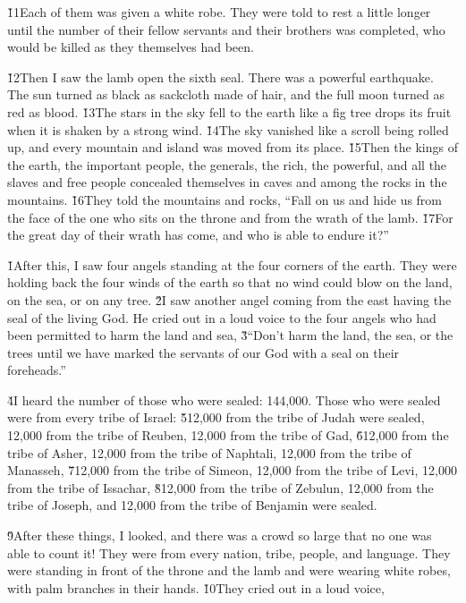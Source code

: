 \v{11}Each of them was given a white robe. They were told to rest a little longer until the number of their fellow servants and their brothers was completed, who would be killed as they themselves had been.

\v{12}Then I saw the lamb open the sixth seal. There was a powerful earthquake. The sun turned as black as sackcloth made of hair, and the full moon turned as red as blood. \v{13}The stars in the sky fell to the earth like a fig tree drops its fruit when it is shaken by a strong wind. \v{14}The sky vanished like a scroll being rolled up, and every mountain and island was moved from its place. \v{15}Then the kings of the earth, the important people, the generals, the rich, the powerful, and all the slaves and free people concealed themselves in caves and among the rocks in the mountains. \v{16}They told the mountains and rocks, ``Fall on us and hide us from the face of the one who sits on the throne and from the wrath of the lamb. \v{17}For the great day of their wrath has come, and who is able to endure it?''

\v{1}After this, I saw four angels standing at the four corners of the earth. They were holding back the four winds of the earth so that no wind could blow on the land, on the sea, or on any tree. \v{2}I saw another angel coming from the east having the seal of the living God. He cried out in a loud voice to the four angels who had been permitted to harm the land and sea, \v{3}``Don't harm the land, the sea, or the trees until we have marked the servants of our God with a seal on their foreheads.''

\v{4}I heard the number of those who were sealed: 144,000. Those who were sealed were from every tribe of Israel: \v{5}12,000 from the tribe of Judah were sealed, 12,000 from the tribe of Reuben, 12,000 from the tribe of Gad, \v{6}12,000 from the tribe of Asher, 12,000 from the tribe of Naphtali, 12,000 from the tribe of Manasseh, \v{7}12,000 from the tribe of Simeon, 12,000 from the tribe of Levi, 12,000 from the tribe of Issachar, \v{8}12,000 from the tribe of Zebulun, 12,000 from the tribe of Joseph, and 12,000 from the tribe of Benjamin were sealed.

\v{9}After these things, I looked, and there was a crowd so large that no one was able to count it! They were from every nation, tribe, people, and language. They were standing in front of the throne and the lamb and were wearing white robes, with palm branches in their hands. \v{10}They cried out in a loud voice,

